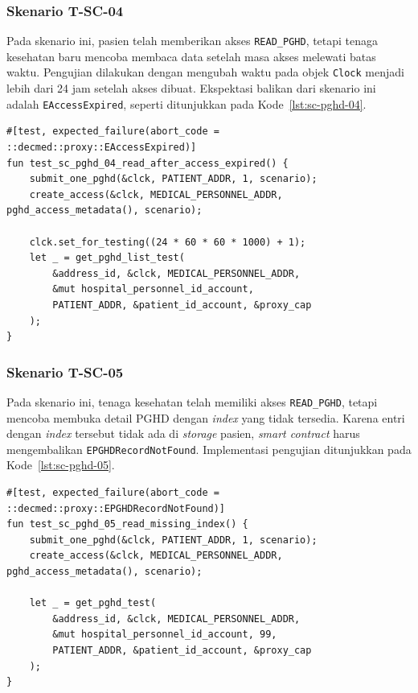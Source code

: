 \subsubsection{Skenario T-SC-04}

Pada skenario ini, pasien telah memberikan akses \texttt{READ\_PGHD}, tetapi tenaga kesehatan baru mencoba membaca data setelah masa akses melewati batas waktu.
Pengujian dilakukan dengan mengubah waktu pada objek \texttt{Clock} menjadi lebih dari 24 jam setelah akses dibuat.
Ekspektasi balikan dari skenario ini adalah \texttt{EAccessExpired}, seperti ditunjukkan pada Kode~\ref{lst:sc-pghd-04}.

\begin{lstlisting}[caption={Pengujian baca PGHD setelah akses expired}, label={lst:sc-pghd-04}, float=htb]
#[test, expected_failure(abort_code = ::decmed::proxy::EAccessExpired)]
fun test_sc_pghd_04_read_after_access_expired() {
    submit_one_pghd(&clck, PATIENT_ADDR, 1, scenario);
    create_access(&clck, MEDICAL_PERSONNEL_ADDR, pghd_access_metadata(), scenario);

    clck.set_for_testing((24 * 60 * 60 * 1000) + 1);
    let _ = get_pghd_list_test(
        &address_id, &clck, MEDICAL_PERSONNEL_ADDR,
        &mut hospital_personnel_id_account,
        PATIENT_ADDR, &patient_id_account, &proxy_cap
    );
}
\end{lstlisting}

\subsubsection{Skenario T-SC-05}

Pada skenario ini, tenaga kesehatan telah memiliki akses \texttt{READ\_PGHD}, tetapi mencoba membuka detail PGHD dengan \textit{index} yang tidak tersedia.
Karena entri dengan \textit{index} tersebut tidak ada di \textit{storage} pasien, \textit{smart contract} harus mengembalikan \texttt{EPGHDRecordNotFound}.
Implementasi pengujian ditunjukkan pada Kode~\ref{lst:sc-pghd-05}.

\begin{lstlisting}[caption={Pengujian buka detail PGHD dengan index tidak tersedia}, label={lst:sc-pghd-05}, float=htb]
#[test, expected_failure(abort_code = ::decmed::proxy::EPGHDRecordNotFound)]
fun test_sc_pghd_05_read_missing_index() {
    submit_one_pghd(&clck, PATIENT_ADDR, 1, scenario);
    create_access(&clck, MEDICAL_PERSONNEL_ADDR, pghd_access_metadata(), scenario);

    let _ = get_pghd_test(
        &address_id, &clck, MEDICAL_PERSONNEL_ADDR,
        &mut hospital_personnel_id_account, 99,
        PATIENT_ADDR, &patient_id_account, &proxy_cap
    );
}
\end{lstlisting}

